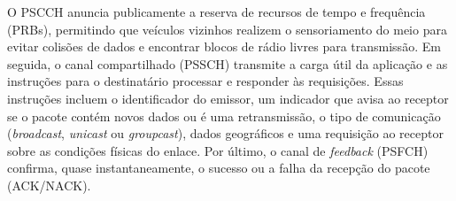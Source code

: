 O \gls{PSCCH} anuncia publicamente a reserva de recursos de tempo e frequência (\glspl{PRB}), permitindo que veículos vizinhos realizem o sensoriamento do meio para evitar colisões de dados e encontrar blocos de rádio livres para transmissão. Em seguida, o canal compartilhado (\gls{PSSCH}) transmite a carga útil da aplicação e as instruções para o destinatário processar e responder às requisições. Essas instruções incluem o identificador do emissor, um indicador que avisa ao receptor se o pacote contém novos dados ou é uma retransmissão, o tipo de comunicação (\textit{broadcast}, \textit{unicast} ou \textit{groupcast}), dados geográficos e uma requisição ao receptor sobre as condições físicas do enlace. Por último, o canal de \textit{feedback} (\gls{PSFCH}) confirma, quase instantaneamente, o sucesso ou a falha da recepção do pacote (ACK/NACK). 

